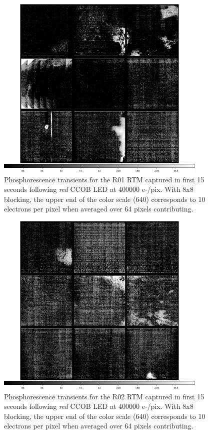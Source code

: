 \begin{figure}[htbp]
\centering
\includegraphics[width=0.9\textwidth]{sections/figures/phosphorescence-survey/itl_fluor_R01_0-19_rb1_log.png}
\caption{Phosphorescence transients for the R01 RTM captured in first 15 seconds following {\it red} CCOB LED at 400000 e-/pix. With 8x8 blocking, the upper end of the color scale (640) corresponds to 10 electrons per pixel when averaged over 64 pixels contributing.}
\label{fig:phos:R01}
\end{figure}

\begin{figure}[htbp]
\centering
\includegraphics[width=0.9\textwidth]{sections/figures/phosphorescence-survey/itl_fluor_R02_0-19_rb1_log.png}
\caption{Phosphorescence transients for the R02 RTM captured in first 15 seconds following {\it red} CCOB LED at 400000 e-/pix. With 8x8 blocking, the upper end of the color scale (640) corresponds to 10 electrons per pixel when averaged over 64 pixels contributing.}
\label{fig:phos:R02}
\end{figure}

